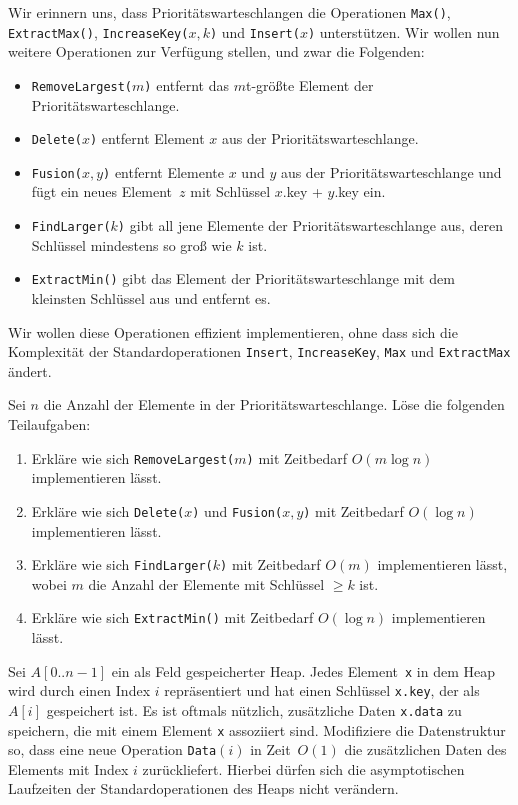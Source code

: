 \documentclass{uebung_cs}
\begin{document}
\begin{aufgabe}\hspace{.5em}
	Wir erinnern uns, dass Prio\-ri\-täts\-war\-te\-schlang\-en die Operationen \texttt{Max()}, \texttt{ExtractMax()}, \texttt{IncreaseKey($x,k$)} und \texttt{Insert($x$)} unterstützen.
	Wir wollen nun weitere Operationen zur Verfügung stellen, und zwar die Folgenden:
	\begin{itemize}
		\item \texttt{RemoveLargest($m$)} entfernt das $m$t-größte Element der Prioritätswarteschlange.
		\item \texttt{Delete($x$)} entfernt Element $x$ aus der Prioritätswarteschlange.
		\item \texttt{Fusion($x,y$)} entfernt Elemente $x$ und $y$ aus der Prioritätswarteschlange und fügt ein neues Element~$z$ mit Schlüssel $x$.key + $y$.key ein.
		\item \texttt{FindLarger($k$)} gibt all jene Elemente der Prioritätswarteschlange aus, deren Schlüssel mindestens so groß wie $k$ ist.
		\item \texttt{ExtractMin()} gibt das Element der Prioritätswarteschlange mit dem kleinsten Schlüssel aus und entfernt es.
	\end{itemize}
	Wir wollen diese Operationen effizient implementieren, ohne dass sich die Komplexität der Standardoperationen \texttt{Insert}, \texttt{IncreaseKey}, \texttt{Max} und \texttt{ExtractMax} ändert.

	Sei $n$ die Anzahl der Elemente in der Prioritätswarteschlange.
	Löse die folgenden Teilaufgaben:
	\begin{enumerate}
		\item \mittel Erkläre wie sich \texttt{RemoveLargest($m$)} mit Zeitbedarf $O(m\log n)$ implementieren lässt.
		\item \mittel Erkläre wie sich \texttt{Delete($x$)} und \texttt{Fusion($x,y$)} mit Zeitbedarf $O(\log n)$ implementieren lässt.
		\item \mittel %
    Erkläre wie sich \texttt{FindLarger($k$)} mit Zeitbedarf $O(m)$ implementieren lässt, wobei $m$ die Anzahl der Elemente mit Schlüssel $\geq k$ ist.
		\item \note %
    Erkläre wie sich \texttt{ExtractMin()} mit Zeitbedarf $O(\log n)$ implementieren lässt.
	\end{enumerate}
\end{aufgabe}

\begin{aufgabe}
	Sei $A[0..n-1]$ ein als Feld gespeicherter Heap.
	Jedes Element~\texttt{x} in dem Heap wird durch einen Index $i$ repräsentiert und hat einen Schlüssel \texttt{x.key}, der als $A[i]$ gespeichert ist.
	Es ist oftmals nützlich, zusätzliche Daten \texttt{x.data} zu speichern, die mit einem Element \texttt{x} assoziiert sind.
	Modifiziere die Datenstruktur so, dass eine neue Operation \texttt{Data$(i)$} in Zeit~$O(1)$ die zusätzlichen Daten des Elements mit Index $i$ zurückliefert. Hierbei dürfen sich die asymptotischen Laufzeiten der Standardoperationen des Heaps nicht verändern.
\end{aufgabe}
\end{document}
